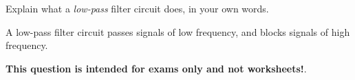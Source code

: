 

Explain what a {\it low-pass} filter circuit does, in your own words.







A low-pass filter circuit passes signals of low frequency, and blocks signals of high frequency.







{\bf This question is intended for exams only and not worksheets!}.



